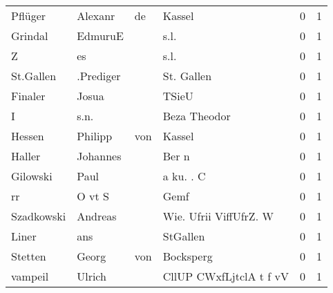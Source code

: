 \begin{tabular}{llllrr}
                  Pflüger &                            Alexanr &          de &                                      Kassel &          0 &         1 \\
                  Grindal &                            EdmuruE &             &                                        s.l. &          0 &         1 \\
                        Z &                                 es &             &                                        s.l. &          0 &         1 \\
                St.Gallen &                          .Prediger &             &                                  St. Gallen &          0 &         1 \\
                  Finaler &                              Josua &             &                                       TSieU &          0 &         1 \\
                        I &                               s.n. &             &                                Beza Theodor &          0 &         1 \\
                   Hessen &                            Philipp &         von &                                      Kassel &          0 &         1 \\
                   Haller &                           Johannes &             &                                       Ber n &          0 &         1 \\
                 Gilowski &                               Paul &             &                                   a ku. . C &          0 &         1 \\
                       rr &                             O vt S &             &                                        Gemf &          0 &         1 \\
               Szadkowski &                            Andreas &             &                      Wie. Ufrii ViffUfrZ. W &          0 &         1 \\
                    Liner &                                ans &             &                                    StGallen &          0 &         1 \\
                  Stetten &                              Georg &         von &                                   Bocksperg &          0 &         1 \\
                  vampeil &                             Ulrich &             &                     CllUP CWxfLjtclA t f vV &          0 &         1 \\

\end{tabular}
